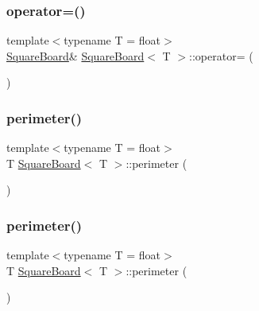 \subsubsection{\texorpdfstring{operator=()}{operator=()}\hspace{0.1cm}{\footnotesize\ttfamily [4/4]}}
{\footnotesize\ttfamily template$<$typename T  = float$>$ \\
\mbox{\hyperlink{classSquareBoard}{Square\+Board}}\& \mbox{\hyperlink{classSquareBoard}{Square\+Board}}$<$ T $>$\+::operator= (\begin{DoxyParamCaption}\item[{const \mbox{\hyperlink{classSquareBoard}{Square\+Board}}$<$ T $>$ \&}]{ }\end{DoxyParamCaption})\hspace{0.3cm}{\ttfamily [default]}}

\mbox{\label{classSquareBoard_a8b2ae6ea7295b2bff171b3d6311a456c}} 
\subsubsection{\texorpdfstring{perimeter()}{perimeter()}\hspace{0.1cm}{\footnotesize\ttfamily [1/2]}}
{\footnotesize\ttfamily template$<$typename T  = float$>$ \\
T \mbox{\hyperlink{classSquareBoard}{Square\+Board}}$<$ T $>$\+::perimeter (\begin{DoxyParamCaption}{ }\end{DoxyParamCaption})}

\mbox{\label{classSquareBoard_a8b2ae6ea7295b2bff171b3d6311a456c}} 
\subsubsection{\texorpdfstring{perimeter()}{perimeter()}\hspace{0.1cm}{\footnotesize\ttfamily [2/2]}}
{\footnotesize\ttfamily template$<$typename T  = float$>$ \\
T \mbox{\hyperlink{classSquareBoard}{Square\+Board}}$<$ T $>$\+::perimeter (\begin{DoxyParamCaption}{ }\end{DoxyParamCaption})}



